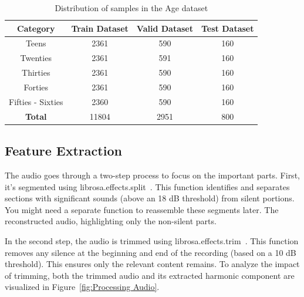 \documentclass[conference, 10pt,onecolumn]{IEEEtran}
\begin{document}
\begin{table}[htbp]
    \centering
    \begin{tabular}{|c|ccc|}
    \hline
    \textbf{Category} & \textbf{Train Dataset} & \textbf{Valid Dataset} & \textbf{Test Dataset}\\
    \hline
    Teens & 2361 & 590 & 160 \\
    Twenties & 2361 & 591 & 160 \\
    Thirties & 2361 & 590 & 160 \\
    Forties & 2361 & 590 & 160 \\
    Fifties - Sixties & 2360 & 590 & 160 \\
    \hline
    \textbf{Total} & 11804 & 2951 & 800\\
    \hline
    \end{tabular}
    \caption{Distribution of samples in the Age dataset}
    \label{tab:Distribution of samples in the Age dataset}
\end{table}
\subsection{Feature Extraction} 
The audio goes through a two-step process to focus on the important parts. First, it's segmented using librosa.effects.split~\cite{mcfee2015librosa}. This function identifies and separates sections with significant sounds (above an 18 dB threshold) from silent portions. You might need a separate function to reassemble these segments later. The reconstructed audio, highlighting only the non-silent parts.

In the second step, the audio is trimmed using librosa.effects.trim~\cite{mcfee2015librosa}. This function removes any silence at the beginning and end of the recording (based on a 10 dB threshold). This ensures only the relevant content remains. To analyze the impact of trimming, both the trimmed audio and its extracted harmonic component are visualized in Figure~\ref{fig:Processing Audio}.
\end{document}
